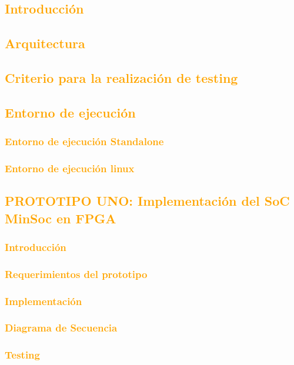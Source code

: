 \documentclass[a4paper,11pt]{article}
\begin{document}
	\subsection{\textcolor{orange}{Introducción}}
	\subsection{\textcolor{orange}{Arquitectura}}
	\subsection{\textcolor{orange}{Criterio para la realización de testing}}
	\subsection{\textcolor{orange}{Entorno de ejecución}}
		\subsubsection{\textcolor{orange}{Entorno de ejecución Standalone}}
		\subsubsection{\textcolor{orange}{Entorno de ejecución linux}}
	\subsection{\textcolor{orange}{PROTOTIPO UNO: Implementación del SoC MinSoc en FPGA}}
		\subsubsection{\textcolor{orange}{Introducción}}
		\subsubsection{\textcolor{orange}{Requerimientos del prototipo}}
		\subsubsection{\textcolor{orange}{Implementación}}
			\subsubsection{\textcolor{orange}{Diagrama de Secuencia}}
			\subsubsection{\textcolor{orange}{Testing}}
\end{document}
